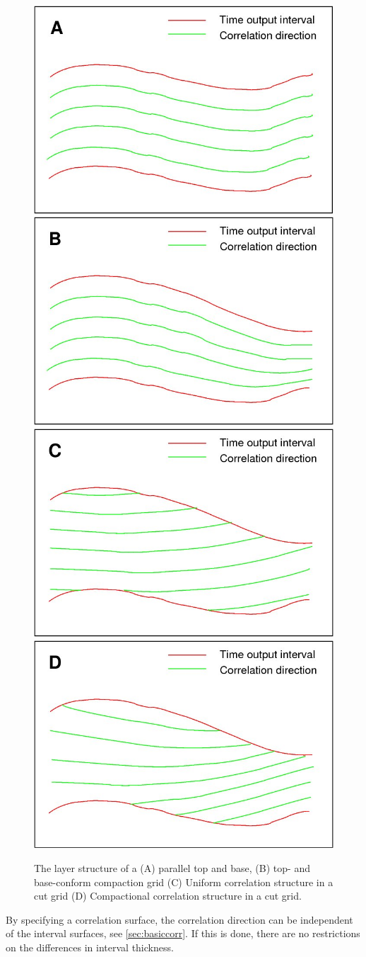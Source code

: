 \begin{figure}
  \includegraphics[width=.49\linewidth]{images/A_correlation_parallel}
  \includegraphics[width=.49\linewidth]{images/B_correlation_proportional}\\
  \includegraphics[width=.49\linewidth]{images/C_correlation_parallel_timecut}
  \includegraphics[width=.49\linewidth]{images/D_correlation_proportional_timecut}
  \caption{The layer structure of a (A) parallel top and base,
    (B) top- and base-conform compaction grid (C) Uniform correlation structure in a cut grid (D) Compactional correlation structure in a cut grid.}
  \label{fig:inversion-interval-types}
\end{figure}
By specifying a correlation surface, the correlation direction can be independent of the interval surfaces, see \autoref{sec:basiccorr}. If this is done, there are no restrictions on the differences in interval thickness.

